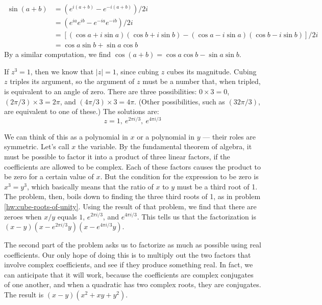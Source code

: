 \begin{align*}
\sin(a+b) &= \left(e^{i(a+b)}-e^{-i(a+b)}\right)/2i \\
          &= \left(e^{ia}e^{ib}-e^{-ia}e^{-ib}\right)/2i \\
          &= \left[(\cos a+i\sin a)(\cos b+i\sin b)-(\cos a-i\sin a)(\cos b-i\sin b)\right]/2i \\
          &= \cos a\sin b +\sin a\cos b
\end{align*}
By a similar computation, we find $\cos(a+b)=\cos a\cos b-\sin a\sin b$.

If $z^3=1$, then we know that $|z|=1$, since cubing $z$ cubes its magnitude. Cubing $z$ triples
its argument, so the argument of $z$ must be a number that, when tripled, is equivalent to an
angle of zero. There are three possibilities: $0\times 3=0$, $(2\pi/3)\times 3=2\pi$,
and $(4\pi/3)\times 3=4\pi$. (Other possibilities, such as $(32\pi/3)$, are equivalent to
one of these.) The solutions are:
\begin{equation*}
z = 1,\ e^{2\pi i/3},\ e^{4\pi i/3}
\end{equation*}

We can think of this as a polynomial in $x$ or a polynomial in $y$ --- their roles are symmetric. Let's call $x$ the variable.
By the fundamental theorem of algebra, it must be possible to factor it into a product of three
linear factors, if the coefficients are allowed to be complex. Each of these factors causes the
product to be zero for a certain value of $x$. But the condition for the expression to be
zero is $x^3=y^3$, which basically means that the ratio of $x$ to $y$ must be a third root of 1.
The problem, then, boils down to finding the three third roots of 1, as in
problem \ref{hw:cube-roots-of-unity}. Using the result of that problem, we find that there
are zeroes when $x/y$ equals $1$, $e^{2\pi i/3}$, and $e^{4\pi i/3}$. This tells us that
the factorization is $(x-y)(x-e^{2\pi i/3}y)(x-e^{4\pi i/3}y)$.

The second part of the problem asks us to factorize as much as possible using real coefficients.
Our only hope of doing this is to multiply out the two factors that involve complex coefficients,
and see if they produce something real. In fact, we can anticipate that it will work, because
the coefficients are complex conjugates of one another, and when a quadratic has two complex
roots, they are conjugates. The result is $(x-y)(x^2+xy+y^2)$.


